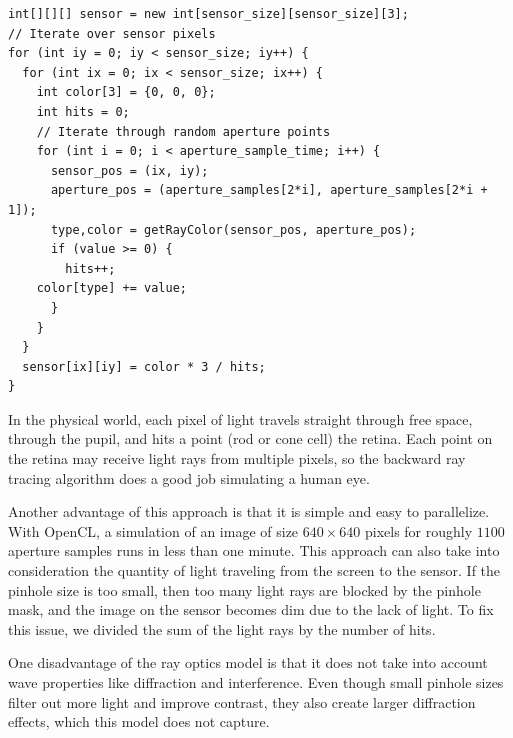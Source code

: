 \begin{lstlisting}[frame=single, basicstyle=\footnotesize\ttfamily, caption=Pseudocode For Ray Optics Simulation]
int[][][] sensor = new int[sensor_size][sensor_size][3];
// Iterate over sensor pixels
for (int iy = 0; iy < sensor_size; iy++) {
  for (int ix = 0; ix < sensor_size; ix++) {
    int color[3] = {0, 0, 0};
    int hits = 0;
    // Iterate through random aperture points
    for (int i = 0; i < aperture_sample_time; i++) {
      sensor_pos = (ix, iy);
      aperture_pos = (aperture_samples[2*i], aperture_samples[2*i + 1]);
      type,color = getRayColor(sensor_pos, aperture_pos);
      if (value >= 0) {
        hits++;
	color[type] += value;
      }
    }
  }
  sensor[ix][iy] = color * 3 / hits;
}
\end{lstlisting}

In the physical world, each pixel of light travels straight through free space, through the pupil, and hits a point (rod or cone cell) the retina. Each point on the retina may receive light rays from multiple pixels, so the backward ray tracing algorithm does a good job simulating a human eye. 

Another advantage of this approach is that it is simple and easy to parallelize. With OpenCL, a simulation of an image of size $640\times640$ pixels for roughly $1100$ aperture samples runs in less than one minute. This approach can also take into consideration the quantity of light traveling from the screen to the sensor. If the pinhole size is too small, then too many light rays are blocked by the pinhole mask, and the image on the sensor becomes dim due to the lack of light. To fix this issue, we divided the sum of the light rays by the number of hits. 

One disadvantage of the ray optics model is that it does not take into account wave properties like diffraction and interference. Even though small pinhole sizes filter out more light and improve contrast, they also create larger diffraction effects, which this model does not capture. 